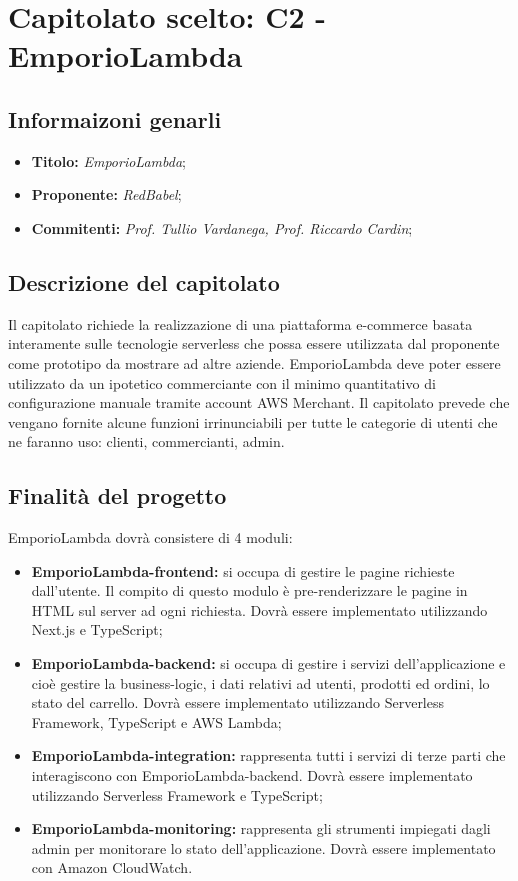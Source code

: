 \section{Capitolato scelto: C2 -  	EmporioLambda}
\subsection{Informaizoni genarli}
\begin{itemize}
    \item \textbf{Titolo:} \textit{EmporioLambda};
    \item \textbf{Proponente:} \textit{RedBabel};
    \item \textbf{Commitenti:} \textit{Prof. Tullio Vardanega, Prof. Riccardo Cardin};
\end{itemize}
\subsection{Descrizione del capitolato}
Il capitolato richiede la realizzazione di una piattaforma e-commerce 
basata interamente sulle tecnologie serverless che possa essere utilizzata 
dal proponente come prototipo da mostrare ad altre aziende. EmporioLambda 
deve poter essere utilizzato da un ipotetico commerciante con il minimo 
quantitativo di configurazione manuale tramite account AWS Merchant. 
Il capitolato prevede che vengano fornite alcune funzioni irrinunciabili 
per tutte le categorie di utenti che ne faranno uso: clienti, commercianti,
 admin.
\subsection{Finalità del progetto}
EmporioLambda dovrà consistere di 4 moduli: 
\begin{itemize}
    \item \textbf{EmporioLambda-frontend:} si occupa di gestire le pagine richieste dall’utente. Il compito di questo modulo è pre-renderizzare le pagine in HTML sul server ad ogni richiesta. Dovrà essere implementato utilizzando Next.js e TypeScript;
    \item \textbf{EmporioLambda-backend:} si occupa di gestire i servizi dell’applicazione e cioè gestire la business-logic, i dati relativi ad utenti, prodotti ed ordini, lo stato del carrello. Dovrà essere implementato utilizzando Serverless Framework, TypeScript e AWS Lambda;
    \item \textbf{EmporioLambda-integration:} rappresenta tutti i servizi di terze parti che interagiscono con EmporioLambda-backend. Dovrà essere implementato utilizzando Serverless Framework e TypeScript;
    \item \textbf{EmporioLambda-monitoring:} rappresenta gli strumenti impiegati dagli admin per monitorare lo stato dell’applicazione. Dovrà essere implementato con Amazon CloudWatch.
\end{itemize}
